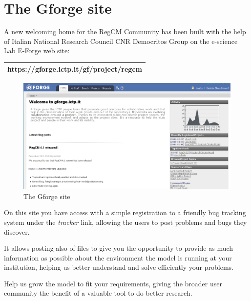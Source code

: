 %
%

\section{The Gforge site}

A new welcoming home for the RegCM Community has been built with the help
of Italian National Research Council CNR Democritos Group on the e-science
Lab E-Forge web site:

\vspace{0.5cm}
\begin{tabular}{|c|}
\hline
{\bf https://gforge.ictp.it/gf/project/regcm} \\
\hline
\end{tabular}
\vspace{0.5cm}

\begin{figure}[h!]
\caption{The Gforge site}
\centering
\includegraphics[width=12cm]{gforge}
\end{figure}

On this site you have access with a simple registration to a friendly
bug tracking system under the {\em tracker} link, allowing the users to
post problems and bugs they discover.

It allows posting also of files to give you the opportunity to provide as
much information as possible about the environment the model is running at
your institution, helping us better understand and solve efficiently your
problems.

Help us grow the model to fit your requirements, giving the broader user
community the benefit of a valuable tool to do better research.
